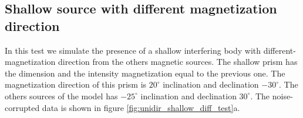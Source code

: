 \subsection{Shallow source with different magnetization direction}

In this test we simulate the presence of a shallow interfering body with different-magnetization direction from the others magnetic sources. The shallow prism has the dimension and the intensity magnetization equal to the previous one. The magnetization direction of this prism is $20^\circ$ inclination and declination $-30^\circ$. The others sources of the model has $-25^\circ$ inclination and declination $30^\circ$. The noise-corrupted data is shown in figure \ref{fig:unidir_shallow_diff_test}a.





























